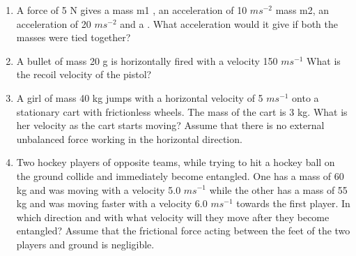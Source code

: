 \begin{enumerate}[label=\arabic*.,ref=\thesection.\theenumi]
\item  A force of 5 N gives a mass m1
, an acceleration of 10 $m s^{-2}$ mass m2, an acceleration of 20 $m s^{-2}$
and a .
What acceleration would it give if both the masses were tied together?
\item  A bullet of mass 20 g is horizontally fired with a velocity 150 $m s^{-1}$
What is the recoil velocity of the pistol?
\item  A girl of mass 40 kg jumps with a horizontal velocity of 5 $m s^{-1}$
onto
a stationary cart with frictionless wheels. The mass of the cart is 3 kg. What is her velocity as the cart starts moving? Assume that there is no external unbalanced force working in the horizontal direction.
\item  Two hockey players of opposite teams, while trying to hit a hockey ball on the ground collide and immediately become entangled. One has a mass of 60 kg and was moving with a velocity 5.0 $m s^{-1}$
while the other
has a mass of 55 kg and was moving faster with a velocity 6.0 $m s^{-1}$
towards
the first player. In which direction and with what velocity will they move after they become entangled? Assume that the frictional force acting between the feet of the two players and ground is negligible.


\end{enumerate}

